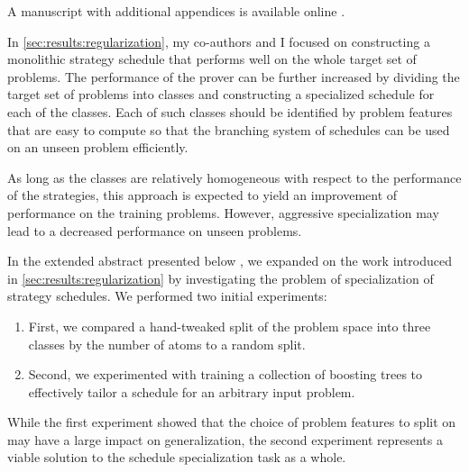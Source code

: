 A manuscript with additional appendices is available online \cite{DBLP:journals/corr/abs-2403-12869}.


\label{sec:results:cautious}

In \cref{sec:results:regularization},
my co-authors and I focused on constructing a monolithic strategy schedule that performs well on the whole target set of problems.
The performance of the prover can be further increased by dividing the target set of problems into classes
and constructing a specialized schedule for each of the classes.
Each of such classes should be identified by problem features that are easy to compute
so that the branching system of schedules can be used on an unseen problem efficiently.

As long as the classes are relatively homogeneous with respect to the performance of the strategies,
this approach is expected to yield an improvement of performance on the training problems.
However, aggressive specialization may lead to a decreased performance on unseen problems.

In the extended abstract presented below \cite{DBLP:conf/paar/BartekC024},
we expanded on the work introduced in \cref{sec:results:regularization}
by investigating the problem of specialization of strategy schedules.
We performed two initial experiments:
\begin{enumerate}
\item First, we compared a hand-tweaked split of the problem space into three classes by the number of atoms to a random split.
\item Second, we experimented with training a collection of boosting trees to effectively tailor a schedule for an arbitrary input problem.
\end{enumerate}

While the first experiment showed that the choice of problem features to split on may have a large impact on generalization,
the second experiment represents a viable solution to the schedule specialization task as a whole.

